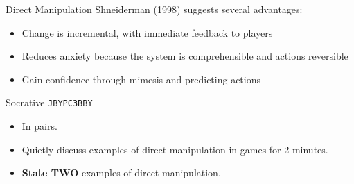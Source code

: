 \begin{frame}{Direct Manipulation}
	Shneiderman (1998) suggests several advantages:
	
	\begin{itemize}
		\item Change is incremental, with immediate feedback to players \pause
		\item Reduces anxiety because the system is comprehensible and actions reversible \pause
		\item Gain confidence through mimesis and predicting actions
	\end{itemize}
\end{frame}

\begin{frame}[fragile]{Socrative \texttt{JBYPC3BBY}}
	\begin{itemize}
		\item In pairs.
		\item Quietly discuss examples of direct manipulation in games for 2-minutes.
		\item \textbf{State TWO} examples of direct manipulation.
	\end{itemize}
\end{frame}